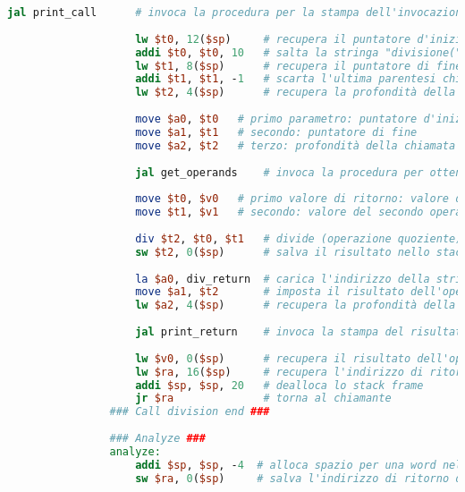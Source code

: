 \begin{center}
\begin{lstlisting}[language=mips, gobble=14, stepnumber=1]
                    jal print_call      # invoca la procedura per la stampa dell'invocazione (con gli stessi parametri)
                    
                    lw $t0, 12($sp)     # recupera il puntatore d'inizio dallo stack
                    addi $t0, $t0, 10   # salta la stringa "divisione(" (10 caratteri)
                    lw $t1, 8($sp)      # recupera il puntatore di fine
                    addi $t1, $t1, -1   # scarta l'ultima parentesi chiusa
                    lw $t2, 4($sp)      # recupera la profondità della chiamata
                    
                    move $a0, $t0   # primo parametro: puntatore d'inizio
                    move $a1, $t1   # secondo: puntatore di fine
                    move $a2, $t2   # terzo: profondità della chiamata
                    
                    jal get_operands    # invoca la procedura per ottenere gli operandi
                    
                    move $t0, $v0   # primo valore di ritorno: valore del primo operando
                    move $t1, $v1   # secondo: valore del secondo operando
                    
                    div $t2, $t0, $t1   # divide (operazione quoziente) il primo operando per il secondo
                    sw $t2, 0($sp)      # salva il risultato nello stack
                    
                    la $a0, div_return  # carica l'indirizzo della stringa div_return (primo parametro)
                    move $a1, $t2       # imposta il risultato dell'operazione come secondo parametro
                    lw $a2, 4($sp)      # recupera la profondità della chiamata (terzo parametro)
                    
                    jal print_return    # invoca la stampa del risultato con questi tre parametri
                    
                    lw $v0, 0($sp)      # recupera il risultato dell'operazione
                    lw $ra, 16($sp)     # recupera l'indirizzo di ritorno
                    addi $sp, $sp, 20   # dealloca lo stack frame
                    jr $ra              # torna al chiamante
                ### Call division end ###
                    
                ### Analyze ###
                analyze:
                    addi $sp, $sp, -4  # alloca spazio per una word nello stack frame
                    sw $ra, 0($sp)     # salva l'indirizzo di ritorno del chiamante
                

\end{lstlisting}
\end{center}
